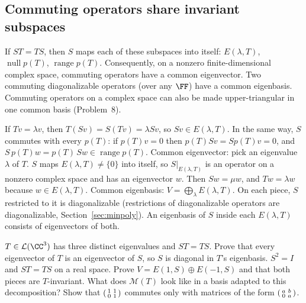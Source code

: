 \documentclass[10pt]{scrartcl}
\DeclareMathOperator{\nul}{null}
\DeclareMathOperator{\range}{range}
\newcommand{\LL}{\mathcal L}
\newcommand{\MM}{\mathcal M}
\begin{document}
\subsection{Commuting operators share invariant subspaces}
\begin{theorem*}[T3]
  If $ST=TS$, then $S$ maps each of these subspaces into itself: $E(\lambda,T)$, $\nul p(T)$, $\range p(T)$.
  Consequently, on a nonzero finite-dimensional complex space, commuting operators have a common eigenvector. Two commuting diagonalizable operators (over any $\FF$) have a common eigenbasis. Commuting operators on a complex space can also be made upper-triangular in one common basis (Problem~8).
\end{theorem*}
\why If $Tv=\lambda v$, then $T(Sv)=S(Tv)=\lambda Sv$, so $Sv\in E(\lambda,T)$. In the same way, $S$ commutes with every $p(T)$: if $p(T)v=0$ then $p(T)Sv=Sp(T)v=0$, and $S\,p(T)w=p(T)\,Sw\in\range p(T)$.
Common eigenvector: pick an eigenvalue $\lambda$ of $T$. $S$ maps $E(\lambda,T)\ne\{0\}$ into itself, so $S|_{E(\lambda,T)}$ is an operator on a nonzero complex space and has an eigenvector $w$. Then $Sw=\mu w$, and $Tw=\lambda w$ because $w\in E(\lambda,T)$.
Common eigenbasis: $V=\bigoplus_\lambda E(\lambda,T)$. On each piece, $S$ restricted to it is diagonalizable (restrictions of diagonalizable operators are diagonalizable, Section~\ref{sec:minpoly}). An eigenbasis of $S$ inside each $E(\lambda,T)$ consists of eigenvectors of both.
\probs
\begin{enumerate}[(a)]
  \ii $T\in\LL(\CC^3)$ has three distinct eigenvalues and $ST=TS$. Prove that every eigenvector of $T$ is an eigenvector of $S$, so $S$ is diagonal in $T$'s eigenbasis.
  \ii $S^2=I$ and $ST=TS$ on a real space. Prove $V=E(1,S)\oplus E(-1,S)$ and that both pieces are $T$-invariant. What does $\MM(T)$ look like in a basis adapted to this decomposition?
  \ii Show that $\begin{psmallmatrix}1&1\\0&1\end{psmallmatrix}$ commutes only with matrices of the form $\begin{psmallmatrix}a&b\\0&a\end{psmallmatrix}$.
\end{enumerate}
\end{document}
